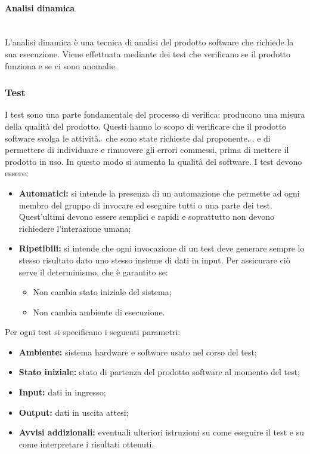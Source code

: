 \paragraph{Analisi dinamica}\label{ProcessiDiSupportoVerificaAttivitàAnalisiAnalisiDinamica}\mbox{}\\
L'analisi dinamica è una tecnica di analisi del prodotto software che richiede la sua esecuzione.
Viene effettuata mediante dei test che verificano se il prodotto funziona e se ci sono anomalie.\\

\subsubsection{Test} \label{ProcessiDiSupportoVerificaAttivitàTest}
I test sono una parte fondamentale del processo di verifica: producono una misura della qualità del prodotto. Questi hanno lo scopo di verificare che il prodotto software svolga le attività$_{\scaleto{G}{3pt}}$ che sono state richieste dal proponente$_{\scaleto{G}{3pt}}$, e di permettere di individuare e rimuovere gli errori  commessi, prima di mettere il prodotto in uso. In questo modo si aumenta la qualità del software. 
I test devono essere:
\begin{itemize}
	\item \textbf{Automatici:} si intende la presenza di un automazione che permette ad ogni membro del gruppo di invocare ed eseguire tutti o una parte dei test. Quest’ultimi devono essere semplici e rapidi e soprattutto non devono richiedere l’interazione umana; 
	\item \textbf{Ripetibili:} si intende che ogni invocazione di un test deve generare sempre lo stesso risultato dato uno stesso insieme di dati in input. Per assicurare ciò serve il determinismo, che è garantito se:
	\begin{itemize}
		\item Non cambia stato iniziale del sistema;
		\item Non cambia ambiente di esecuzione.
	\end{itemize}
\end{itemize}
Per ogni test si specificano i seguenti parametri:
\begin{itemize}
	\item \textbf{Ambiente:} sistema hardware e software usato nel corso del test;
	\item \textbf{Stato iniziale:} stato di partenza del prodotto software al momento del test;
	\item \textbf{Input:} dati in ingresso;
	\item \textbf{Output:} dati in uscita attesi;
	\item \textbf{Avvisi addizionali:} eventuali ulteriori istruzioni su come eseguire il test e su come interpretare i risultati ottenuti.
\end{itemize}
